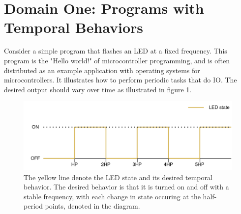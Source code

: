 

\section{Domain One: Programs with Temporal Behaviors}

Consider a simple program
that flashes an LED at a fixed frequency. This program is the "Hello world!" of microcontroller programming, and is often distributed
as an example application with operating systems for microcontrollers. It illustrates how to perform
periodic tasks that do IO. The desired output should vary over time as illustrated in figure \ref{graphics:correct-frequency}.

\begin{figure}
    \centering
    \includegraphics[scale=0.2]{graphics/correct-frequency.png}
    \caption{The yellow line denote the LED state and its desired temporal behavior. The desired behavior
    is that it is turned on and off with a stable frequency, with each change in state occuring at the
    half-period points, denoted  in the diagram.}
    \label{graphics:correct-frequency}
\end{figure}

